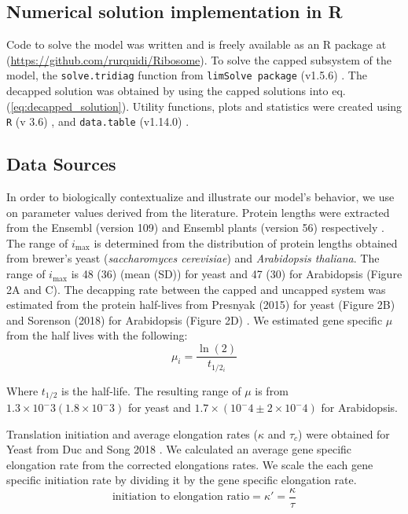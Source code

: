 \documentclass[a4,center,fleqn]{NAR}
\newcommand{\imax}{\ensuremath{{i_{\max}}}\xspace}
\begin{document}
\subsection{Numerical solution implementation in R}
Code to solve the model was written and is freely available as an R package at (\url{https://github.com/rurquidi/Ribosome}). To solve the capped subsystem of the model, the \texttt{solve.tridiag} function from \texttt{limSolve package} (v1.5.6) \citep{RN41}. The decapped solution was obtained by using the capped solutions into eq. (\ref{eq:decapped_solution}). Utility functions, plots and statistics were created using  \texttt{R} (v 3.6) \citep{RN43}, and  \texttt{data.table} (v1.14.0) \citep{RN42}. 
		
\subsection{Data Sources}

In order to biologically contextualize and illustrate our model's behavior, we use on parameter values derived from the literature.
Protein lengths were extracted from the Ensembl (version 109) and Ensembl plants (version 56) respectively \citep{RN26,RN25,RN24}.  
The range of \imax is determined from the distribution of protein lengths obtained from brewer's yeast (\textit{saccharomyces cerevisiae}) and \textit{Arabidopsis thaliana}. The range of \imax is  48 (36) (mean (SD)) for yeast and 47 (30) for Arabidopsis (Figure 2A and C).
The decapping rate between the capped and uncapped system was estimated from the protein half-lives from Presnyak (2015) for yeast (Figure 2B) and Sorenson (2018) for Arabidopsis (Figure 2D) \citep{RN27,RN28}.
We estimated gene specific $\mu$ from the half lives with the following:
	\begin{equation*}
		\mu_i = \frac{\ln(2)}{t_{1/2_i}}
	\end{equation*}

Where $t_{1/2}$ is the half-life. The resulting range of $\mu$ is from $1.3 \times 10^-3 (1.8 \times 10^-3)$ for yeast and $1.7 \times (10^-4 \pm 2 \times 10^-4)$ for Arabidopsis. 

Translation initiation and average elongation rates ($\kappa$ and $\tau_c$) were obtained for Yeast from Duc and Song 2018 \citep{RN13}. 
We calculated an average gene specific elongation rate from the corrected elongations rates. We scale the each gene specific initiation rate by dividing it by the gene specific elongation rate.
\begin{equation}
	\text{initiation to elongation ratio} = \kappa' = \frac{\kappa}{\tau}
\end{equation}
\end{document}
